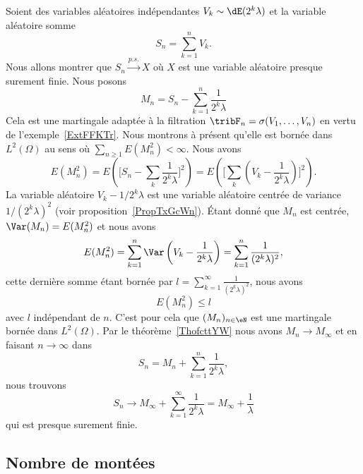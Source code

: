 \begin{example}
	Soient des variables aléatoires indépendantes \( V_k\sim\dE(2^k\lambda)\) et la variable aléatoire somme
	\begin{equation}
		S_n=\sum_{k=1}^nV_k.
	\end{equation}
	Nous allons montrer que \( S_n\stackrel{p.s.}{\longrightarrow}X\) où \( X\) est une variable aléatoire presque surement finie. Nous posons
	\begin{equation}
		M_n=S_n-\sum_{k=1}^n\frac{1}{ 2^k\lambda }
	\end{equation}
	Cela est une martingale adaptée à la filtration \( \tribF_n=\sigma(V_1,\ldots, V_n)\) en vertu de l'exemple~\ref{ExtFFKTr}. Nous montrons à présent qu'elle est bornée dans \( L^2(\Omega)\) au sens où \( \sum_{n\geq 1}E(M_n^2)<\infty\). Nous avons
	\begin{equation}
		E(M_n^2)=E\left( \big[ S_n-\sum_k\frac{1}{ 2^k\lambda } \big]^2 \right)=E\left( \big[ \sum_k(V_k-\frac{1}{ 2^k\lambda }) \big]^2 \right).
	\end{equation}
	La variable aléatoire \( V_k-1/2^k\lambda\) est une variable aléatoire centrée de variance \( 1/(2^k\lambda)^2\) (voir proposition~\ref{PropTxGcWn}). Étant donné que \( M_n\) est centrée, \( \Var(M_n)=E(M_n^2)\) et nous avons
	\begin{equation}
		E(M_n^2)=\sum_{k=1}^n\Var\left( V_k-\frac{1}{ 2^k\lambda } \right)=\sum_{k=1}^n\frac{1}{ (2^k\lambda)^2 },
	\end{equation}
	cette dernière somme étant bornée par \( l=\sum_{k=1}^{\infty}\frac{1}{ (2^k\lambda)^2 }\), nous avons
	\begin{equation}
		E(M_n^2)\leq l
	\end{equation}
	avec \( l\) indépendant de \( n\). C'est pour cela que \( (M_n)_{n\in \eN}\) est une martingale bornée dans \( L^2(\Omega)\). Par le théorème~\ref{ThofcttYW} nous avons \( M_n\to M_{\infty}\) et en faisant \( n\to \infty\) dans
	\begin{equation}
		S_n=M_n+\sum_{k=1}^n\frac{1}{ 2^k\lambda },
	\end{equation}
	nous trouvons
	\begin{equation}
		S_n\to M_{\infty}+\sum_{k=1}^{\infty}\frac{1}{ 2^k\lambda }=M_{\infty}+\frac{1}{ \lambda }
	\end{equation}
	qui est presque surement finie.
\end{example}


\subsection{Nombre de montées}

